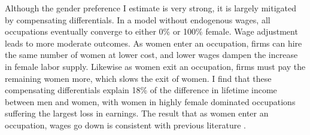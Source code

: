 \documentclass[12pt]{article}
\begin{document}

Although the gender preference I estimate is very strong, it is largely mitigated by compensating differentials. In a model without endogenous wages, all occupations eventually converge to either 0\% or 100\% female. Wage adjustment leads to more moderate outcomes. As women enter an occupation, firms can hire the same number of women at lower cost, and lower wages dampen the increase in female labor supply. Likewise as women exit an occupation, firms must pay the remaining women more, which slows the exit of women. I find that these compensating differentials explain 18\% of the difference in lifetime income between men and women, with women in highly female dominated occupations suffering the largest loss in earnings. The result that as women enter an occupation, wages go down is consistent with previous literature \cite{Levanon2009, Harris2018}.





\end{document}
